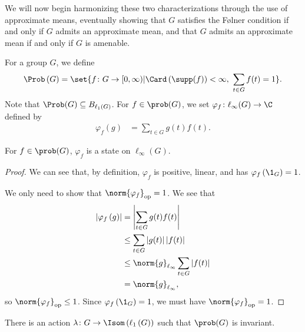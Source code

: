 We will now begin harmonizing these two characterizations through the use of approximate means, eventually showing that $G$ satisfies the Følner condition if and only if $G$ admits an approximate mean, and that $G$ admits an approximate mean if and only if $G$ is amenable.
\begin{definition}\label{def:state_on_prob_g}
  For a group $G$, we define
  \begin{align*}
    \Prob\left(G\right) = \set{f\colon G\rightarrow [0,\infty) | \Card\left(\supp(f)\right)  < \infty,~\sum_{t\in G}f(t) = 1}.
  \end{align*}
  Note that $\Prob(G) \subseteq B_{\ell_1\left(G\right)}$. For $f\in \prob(G)$, we set $\varphi_f\colon \ell_{\infty}(G)\rightarrow \C$ defined by
  \begin{align*}
    \varphi_f\left(g\right) &= \sum_{t\in G}g(t)f(t).
  \end{align*}
\end{definition}
\begin{fact}\label{fact:prob_g_state}
  For $f\in \prob(G)$, $\varphi_f$ is a state on $\ell_{\infty}\left(G\right)$.
\end{fact}
\begin{proof}
We can see that, by definition, $\varphi_f$ is positive, linear, and has $\varphi_f\left(\1_{G}\right) = 1$.\newline

We only need to show that $\norm{\varphi_f}_{\op} = 1$. We see that
\begin{align*}
  \left\vert \varphi_f\left(g\right) \right\vert &= \left\vert \sum_{t\in G}g(t)f(t) \right\vert\\
                                                 &\leq \sum_{t\in G}\left\vert g(t) \right\vert\left\vert f(t) \right\vert\\
                                                 &\leq \norm{g}_{\ell_\infty}\sum_{t\in G}\left\vert f(t) \right\vert\\
                                                 &= \norm{g}_{\ell_\infty},
\end{align*}
so $\norm{\varphi_f}_{\op} \leq 1$. Since $\varphi_f\left(\1_G\right) = 1$, we must have $\norm{\varphi_f}_{\op} = 1$.
\end{proof}
\begin{proposition}
  There is an action $\lambda\colon G\rightarrow \Isom\left(\ell_{1}\left(G\right)\right)$ such that $\prob(G)$ is invariant.
\end{proposition}

